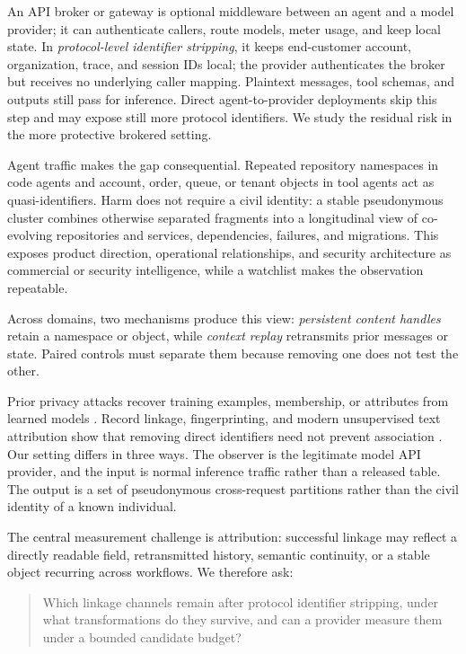\documentclass[letterpaper]{article}
\begin{document}
An API broker or gateway is optional middleware between an agent and a model provider; it can
authenticate callers, route models, meter usage, and keep local state. In \emph{protocol-level
identifier stripping}, it keeps end-customer account, organization, trace, and session IDs local;
the provider authenticates the broker but receives no underlying caller mapping. Plaintext messages,
tool schemas, and outputs still pass for inference. Direct agent-to-provider deployments skip this
step and may expose still more protocol identifiers. We study the residual risk in the more protective
brokered setting.

Agent traffic makes the gap consequential. Repeated repository namespaces in code agents and
account, order, queue, or tenant objects in tool agents act as quasi-identifiers. Harm does not require
a civil identity: a stable pseudonymous cluster combines otherwise separated fragments into a
longitudinal view of co-evolving repositories and services, dependencies, failures, and migrations.
This exposes product direction, operational relationships, and security architecture as commercial
or security intelligence, while a watchlist makes the observation repeatable.

Across domains, two mechanisms produce this view: \emph{persistent content handles} retain a
namespace or object, while \emph{context replay} retransmits prior messages or state. Paired controls
must separate them because removing one does not test the other.

Prior privacy attacks recover training examples, membership, or attributes from learned models
\cite{shokri2017membership,carlini2021extracting}. Record linkage, fingerprinting, and modern
unsupervised text attribution show that removing direct identifiers need not prevent association
\cite{fellegi1969theory,sweeney2002kanonymity,narayanan2009anonymizing,eckersley2010unique,bertocco2023unsupervised}.
Our setting differs in three ways. The observer is the legitimate model API provider, and the input
is normal inference traffic rather than a released table. The output is a set of pseudonymous
cross-request partitions rather than the civil identity of a known individual.

The central measurement challenge is attribution: successful linkage may reflect a directly readable
field, retransmitted history, semantic continuity, or a stable object recurring across workflows. We
therefore ask:

\begin{quote}
Which linkage channels remain after protocol identifier stripping, under what transformations do
they survive, and can a provider measure them under a bounded candidate budget?
\end{quote}
\end{document}
